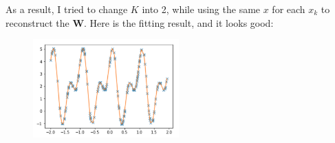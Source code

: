 \documentclass{article}
\newcommand{\V}[1]{\boldsymbol{#1}}
\begin{document}
As a result, I tried to change \( K \) into 2, while using the same \( x \) for each \( x_k \) to reconstruct the \( \V{W} \). Here is the fitting result, and it looks good:
\begin{figure}[ht]
    \centering
    \includegraphics[width=0.5\textwidth]{imgs/4.png}
\end{figure}
\end{document}
